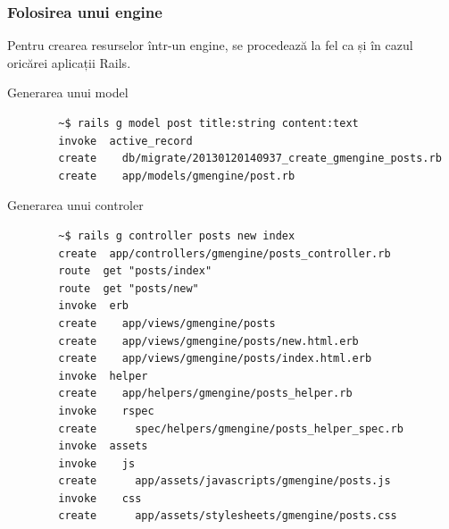\documentclass[compress]{beamer}
\begin{document}
\begin{frame}[fragile]
\frametitle{Folosirea unui engine}

Pentru crearea resurselor într-un engine, se procedează la fel ca și în cazul
oricărei aplicații Rails.
\begin{itemize}
    \begin{item}
      Generarea unui model
      \begin{verbatim}
        ~$ rails g model post title:string content:text
        invoke  active_record
        create    db/migrate/20130120140937_create_gmengine_posts.rb
        create    app/models/gmengine/post.rb
      \end{verbatim}
    \end{item}
    \begin{item}
      Generarea unui controler
      \begin{verbatim}
        ~$ rails g controller posts new index
        create  app/controllers/gmengine/posts_controller.rb
        route  get "posts/index"
        route  get "posts/new"
        invoke  erb
        create    app/views/gmengine/posts
        create    app/views/gmengine/posts/new.html.erb
        create    app/views/gmengine/posts/index.html.erb
        invoke  helper
        create    app/helpers/gmengine/posts_helper.rb
        invoke    rspec
        create      spec/helpers/gmengine/posts_helper_spec.rb
        invoke  assets
        invoke    js
        create      app/assets/javascripts/gmengine/posts.js
        invoke    css
        create      app/assets/stylesheets/gmengine/posts.css
      \end{verbatim}
    \end{item}
\end{itemize}
\end{frame}
\end{document}
